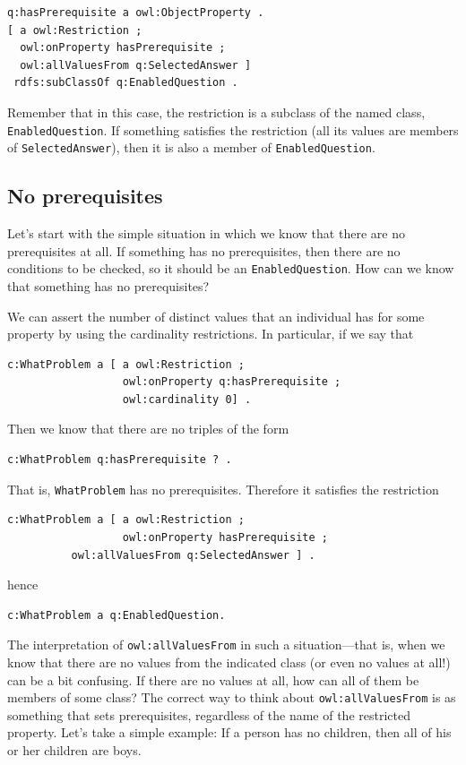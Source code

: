 \begin{lstlisting}
q:hasPrerequisite a owl:ObjectProperty .
[ a owl:Restriction ;
  owl:onProperty hasPrerequisite ;
  owl:allValuesFrom q:SelectedAnswer ] 
 rdfs:subClassOf q:EnabledQuestion .
\end{lstlisting}

Remember that in this case, the restriction is a subclass of the named class, \texttt{EnabledQuestion}.
If something satisfies the restriction (all its values are members of
\texttt{SelectedAnswer}), then it is also a member of \texttt{EnabledQuestion}.

\subsection{No prerequisites}

Let's start with the simple situation in which we know that there are no
prerequisites at all. If something has no prerequisites, then there are
no conditions to be checked, so it should be an \texttt{EnabledQuestion}. How can
we know that something has no prerequisites?

We can assert the number of distinct values that an individual has for
some property by using the
cardinality restrictions. In particular, if we say that

\begin{lstlisting}
c:WhatProblem a [ a owl:Restriction ;
                  owl:onProperty q:hasPrerequisite ;
                  owl:cardinality 0] .
\end{lstlisting}

Then we know that there are no triples of the form

\begin{lstlisting}
c:WhatProblem q:hasPrerequisite ? .
\end{lstlisting}

That is, \texttt{WhatProblem} has no prerequisites. Therefore it satisfies the
restriction

\begin{lstlisting}
c:WhatProblem a [ a owl:Restriction ;
                  owl:onProperty hasPrerequisite ;
		  owl:allValuesFrom q:SelectedAnswer ] .
\end{lstlisting}

hence

\begin{lstlisting}
c:WhatProblem a q:EnabledQuestion.
\end{lstlisting}

The interpretation of \texttt{owl:allValuesFrom} in such a situation---that is,
when we know that there are no values from the indicated class (or even
no values at all!) can be a bit confusing. If there are no values at
all, how can all of them be members of some class? The correct way to
think about \texttt{owl:allValuesFrom} is as something that sets prerequisites,
regardless of the name of the restricted property. Let's take a simple
example: If a person has no children, then all of his or her children
are boys.

